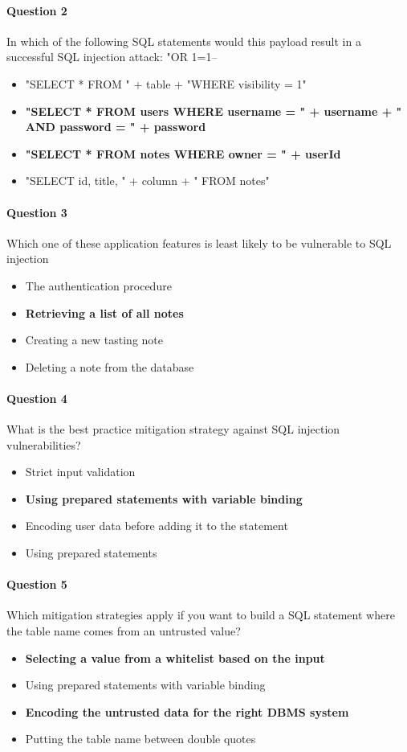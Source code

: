 \documentclass[titlepage]{article}
\begin{document}
    \paragraph{Question 2} In which of the following SQL statements would this payload result in a successful SQL injection attack: "OR 1=1--
    \begin{itemize}
        \item "SELECT * FROM " + table + "WHERE visibility = 1"
        \item \textbf{"SELECT * FROM users WHERE username = " + username + " AND password = " + password} \checkmark
        \item \textbf{"SELECT * FROM notes WHERE owner = " + userId} \checkmark
        \item "SELECT id, title, " + column + " FROM notes"
    \end{itemize}
    \paragraph{Question 3} Which one of these application features is least likely to be vulnerable to SQL injection
    \begin{itemize}
        \item The authentication procedure
        \item \textbf{Retrieving a list of all notes} \checkmark
        \item Creating a new tasting note
        \item Deleting a note from the database
    \end{itemize}
    \paragraph{Question 4} What is the best practice mitigation strategy against SQL injection vulnerabilities?
    \begin{itemize}
        \item Strict input validation
        \item \textbf{Using prepared statements with variable binding} \checkmark
        \item Encoding user data before adding it to the statement
        \item Using prepared statements
    \end{itemize}
    \paragraph{Question 5} Which mitigation strategies apply if you want to build a SQL statement where the table name comes from an untrusted value?
    \begin{itemize}
        \item \textbf{Selecting a value from a whitelist based on the input} \checkmark
        \item Using prepared statements with variable binding
        \item \textbf{Encoding the untrusted data for the right DBMS system} \checkmark
        \item Putting the table name between double quotes
    \end{itemize}
\end{document}
